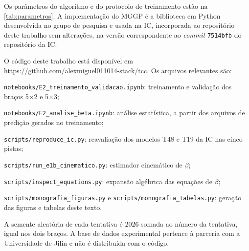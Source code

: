 \label{apen:reprodutibilidade}

Os parâmetros do algoritmo e do protocolo de treinamento estão na \autoref{tab:parametros}. A implementação do MGGP é a biblioteca em Python desenvolvida no grupo de pesquisa e usada na IC, incorporada ao repositório deste trabalho sem alterações, na versão correspondente ao \textit{commit} \texttt{7514bfb} do repositório da IC.

O código deste trabalho está disponível em \url{https://github.com/alexmiguel011014-stack/tcc}. Os arquivos relevantes são:

\begin{alineas}
    \item \texttt{notebooks/E2\_treinamento\_validacao.ipynb}: treinamento e validação dos braços 5×2 e 5×3;
    \item \texttt{notebooks/E2\_analise\_beta.ipynb}: análise estatística, a partir dos arquivos de predição gerados no treinamento;
    \item \texttt{scripts/reproduce\_ic.py}: reavaliação dos modelos T48 e T19 da IC nas cinco pistas;
    \item \texttt{scripts/run\_e1b\_cinematico.py}: estimador cinemático de $\beta$;
    \item \texttt{scripts/inspect\_equations.py}: expansão algébrica das equações de $\beta$;
    \item \texttt{scripts/monografia\_figuras.py} e \texttt{scripts/monografia\_tabelas.py}: geração das figuras e tabelas deste texto.
\end{alineas}

A semente aleatória de cada tentativa é $2026$ somada ao número da tentativa, igual nos dois braços. A base de dados experimental pertence à parceria com a Universidade de Jilin e não é distribuída com o código.
